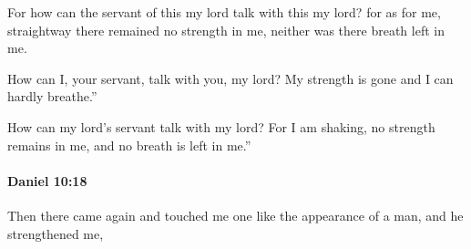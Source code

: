 			\begin{versebox}
					\item[BHS] 
					\item[LXX] 
					\item[ASV] For how can the servant of this my lord talk with this my lord? for as for me, straightway there remained no strength in me, neither was there breath left in me.
					\item[NIV] How can I, your servant, talk with you, my lord? My strength is gone and I can hardly breathe.”
					\item[NRSV] How can my lord’s servant talk with my lord? For I am shaking, no strength remains in me, and no breath is left in me.”
			\end{versebox}

		\paragraph{Daniel 10:18} %
			\label{DANIEL-10-18}

			Then there came again and touched me one like the appearance of a man, and he strengthened me,

